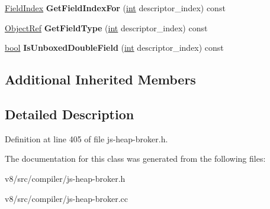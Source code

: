 \begin{DoxyCompactItemize}
\item 
\mbox{\label{classv8_1_1internal_1_1compiler_1_1MapRef_adda4324f803476a14a0f69d9f7e945f8}} 
\mbox{\hyperlink{classv8_1_1internal_1_1FieldIndex}{Field\+Index}} {\bfseries Get\+Field\+Index\+For} (\mbox{\hyperlink{classint}{int}} descriptor\+\_\+index) const
\item 
\mbox{\label{classv8_1_1internal_1_1compiler_1_1MapRef_a8bd8b3539be6a60d1e2dee91ac665722}} 
\mbox{\hyperlink{classv8_1_1internal_1_1compiler_1_1ObjectRef}{Object\+Ref}} {\bfseries Get\+Field\+Type} (\mbox{\hyperlink{classint}{int}} descriptor\+\_\+index) const
\item 
\mbox{\label{classv8_1_1internal_1_1compiler_1_1MapRef_a0b2b9122a5fa5a27e1fe55d3d7f975a4}} 
\mbox{\hyperlink{classbool}{bool}} {\bfseries Is\+Unboxed\+Double\+Field} (\mbox{\hyperlink{classint}{int}} descriptor\+\_\+index) const
\end{DoxyCompactItemize}
\subsection*{Additional Inherited Members}


\subsection{Detailed Description}


Definition at line 405 of file js-\/heap-\/broker.\+h.



The documentation for this class was generated from the following files\+:\begin{DoxyCompactItemize}
\item 
v8/src/compiler/js-\/heap-\/broker.\+h\item 
v8/src/compiler/js-\/heap-\/broker.\+cc\end{DoxyCompactItemize}
